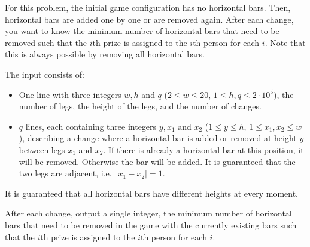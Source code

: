 For this problem, the initial game configuration has no horizontal bars.
Then, horizontal bars are added one by one or are removed again.
After each change, you want to know the minimum number of horizontal bars that need to be removed such that the $i$th prize is assigned to the $i$th person for each $i$.
Note that this is always possible by removing all horizontal bars.
	
\vspace{-3mm}
\begin{Input}
	The input consists of:
	\begin{itemize}
		\item One line with three integers $w, h$ and $q$ ($2 \leq w \leq 20$, $1\leq h,q \leq 2\cdot10^5$), the number of legs, the height of the legs, and the number of changes.
		\item $q$ lines, each containing three integers $y, x_{1}$ and $x_{2}$ ($1\leq y \leq h$, $1\leq x_{1}, x_{2} \leq w$), describing a change where a horizontal bar is added or removed at height $y$ between legs $x_1$ and $x_2$.
								If there is already a horizontal bar at this position, it will be removed. Otherwise the bar will be added.
		It is guaranteed that the two legs are adjacent, i.e.\ $|x_{1}-x_{2}|=1$.
	\end{itemize}	
	It is guaranteed that all horizontal bars have different heights at every moment.
\end{Input}

\begin{Output}
	After each change, output a single integer, the minimum number of horizontal bars that need to be
				removed in the game with the currently existing bars such that the $i$th prize is assigned to the $i$th person for each $i$.
\end{Output}
